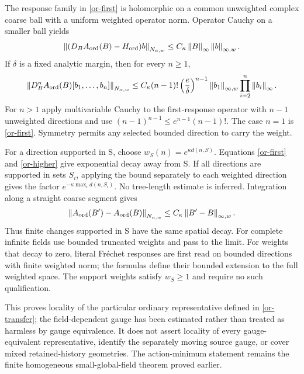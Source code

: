 \documentclass[11pt]{article}
\theoremstyle{remark}
\newcommand{\norm}[1]{\left\|#1\right\|}
\begin{document}
The response family in \eqref{or-first} is holomorphic on a
common unweighted complex coarse ball with a uniform weighted
operator norm. Operator Cauchy on a smaller ball yields
\begin{equation}\label{or-linear-correction}
 \norm{(D_BA_{\rm ord}(B)-H_{\rm ord})b}_{N_{\alpha,w}}
       \le C_\kappa\norm{B}_\infty\norm{b}_{\infty,w}.
\end{equation}
If $\delta$ is a fixed analytic margin, then for every $n\ge1$,
\begin{equation}\label{or-higher}
 \norm{D_B^nA_{\rm ord}(B)[b_1,\ldots,b_n]}_{N_{\alpha,w}}
 \le C_\kappa(n-1)!\left(\frac e\delta\right)^{n-1}
       \norm{b_1}_{\infty,w}\prod_{i=2}^n\norm{b_i}_\infty.
\end{equation}
For $n>1$ apply multivariable Cauchy to the first-response
operator with $n-1$ unweighted directions and use
$(n-1)^{n-1}\le e^{n-1}(n-1)!$. The case $n=1$ is
\eqref{or-first}. Symmetry permits any selected bounded direction
to carry the weight.

For a direction supported in S, choose
$w_S(n)=e^{\kappa d(n,S)}$. Equations \eqref{or-first} and
\eqref{or-higher} give exponential decay away from S. If all
directions are supported in sets $S_i$, applying the bound
separately to each weighted direction gives the factor
$e^{-\kappa\max_i d(n,S_i)}$. No tree-length estimate is inferred.
Integration along a straight coarse segment gives
\begin{equation}\label{or-finite-change}
 \norm{A_{\rm ord}(B')-A_{\rm ord}(B)}_{N_{\alpha,w}}
       \le C_\kappa\norm{B'-B}_{\infty,w}.
\end{equation}
Thus finite changes supported in S have the same spatial decay.
For complete infinite fields use bounded truncated weights and
pass to the limit. For weights that decay to zero, literal
Fr\'echet responses are first read on bounded directions with
finite weighted norm; the formulas define their bounded extension
to the full weighted space. The support weights satisfy $w_S\ge1$
and require no such qualification.

This proves locality of the particular ordinary representative
defined in \eqref{or-transfer}; the field-dependent gauge has been
estimated rather than treated as harmless by gauge equivalence.
It does not assert locality of every gauge-equivalent representative,
identify the separately moving source gauge, or cover mixed
retained-history geometries. The action-minimum statement remains
the finite homogeneous small-global-field theorem proved earlier.
\end{document}
